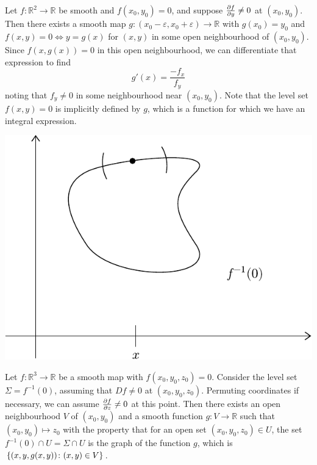 \documentclass[a4paper,11pt]{article}
\begin{document}
\begin{example}
	Let \( f \colon \mathbb R^2 \to \mathbb R \) be smooth and \( f(x_0, y_0) = 0 \), and suppose \( \pdv{f}{y} \neq 0 \) at \( (x_0, y_0) \).
	Then there exists a smooth map \( g \colon (x_0 - \varepsilon, x_0 + \varepsilon) \to \mathbb R \) with \( g(x_0) = y_0 \) and \( f(x,y) = 0 \iff y = g(x) \) for \( (x,y) \) in some open neighbourhood of \( (x_0, y_0) \).
	Since \( f(x,g(x)) = 0 \) in this open neighbourhood, we can differentiate that expression to find
	\[
		g'(x) = \frac{-f_x}{f_y}
	\]
	noting that \( f_y \neq 0 \) in some neighbourhood near \( (x_0, y_0) \).
	Note that the level set \( f(x,y) = 0 \) is implicitly defined by \( g \), which is a function for which we have an integral expression.
	\begin{center}
		\includegraphics[scale=0.8]{Implicit}
	\end{center}
\end{example}

\begin{example}
	Let \( f \colon \mathbb R^3 \to \mathbb R \) be a smooth map with \( f(x_0, y_0, z_0) = 0 \).
	Consider the level set \( \Sigma = f^{-1}(0) \), assuming that \( Df \neq 0 \) at \( (x_0, y_0, z_0) \).
	Permuting coordinates if necessary, we can assume \( \pdv{f}{z} \neq 0 \) at this point.
	Then there exists an open neighbourhood \( V \) of \( (x_0, y_0) \) and a smooth function \( g \colon V \to \mathbb R \) such that \( (x_0, y_0) \mapsto z_0 \) with the property that for an open set \( (x_0, y_0, z_0) \in U \), the set \( f^{-1}(0) \cap U = \Sigma \cap U \) is the graph of the function \( g \), which is \( \qty{ (x,y,g(x,y)) \colon (x,y) \in V } \).
\end{example}
\end{document}
